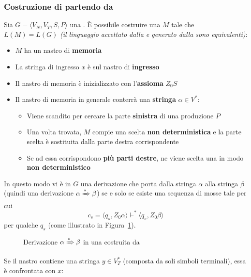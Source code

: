 \documentclass[italian, 10pt]{article}
\begin{document}
\subsubsection{Costruzione di \TM partendo da \GG}

Sia \(G = \langle V_N, V_T, S, P \rangle\) una \GG.
È possibile costruire una \NTM \(M\) tale che \(L(M) = L(G)\) \textit{(il linguaggio accettato dalla \NTM e generato dalla \GG sono equivalenti)}:

\begin{itemize}
  \item \(M\) ha un nastro di \textbf{memoria}
  \item La stringa di ingresso \(x\) è sul nastro di \textbf{ingresso}
  \item Il nastro di memoria è inizializzato con l'\textbf{assioma} \(Z_0 S\)
  \item Il nastro di memoria in generale conterrà una \textbf{stringa} \(\alpha \in V^\ast\):
        \begin{itemize}
          \item Viene scandito per cercare la parte \textbf{sinistra} di una produzione \(P\)
          \item Una volta trovata, \(M\) compie una scelta \textbf{non deterministica} e la parte scelta è sostituita dalla parte destra corrispondente
          \item Se ad essa corrispondono \textbf{più parti destre}, ne viene scelta una in modo \textbf{non deterministico}
        \end{itemize}
\end{itemize}

In questo modo vi è in \(G\) una derivazione che porta dalla stringa \(\alpha\) alla stringa \(\beta\) (quindi una derivazione \(\alpha \xRightarrow{\ast} \beta\)) se e solo se esiste una sequenza di mosse tale per cui
\[ c_s = \langle q_s, Z_0 \alpha \rangle \vdash^\ast \langle q_s, Z_0 \beta \rangle \]
per qualche \(q_s\) (come illustrato in Figura~\ref{fig:derivazione-TM-da-GG}).

\begin{figure}[htbp]
  \bigskip
  \centering
  \caption{Derivazione \(\alpha \xRightarrow{\ast} \beta\) in una \TM costruita da \GG}
  \label{fig:derivazione-TM-da-GG}
  \bigskip
\end{figure}

Se il nastro contiene una stringa \(y \in V_T^\ast\) (composta da soli simboli terminali), essa è confrontata con \(x\):
\end{document}
